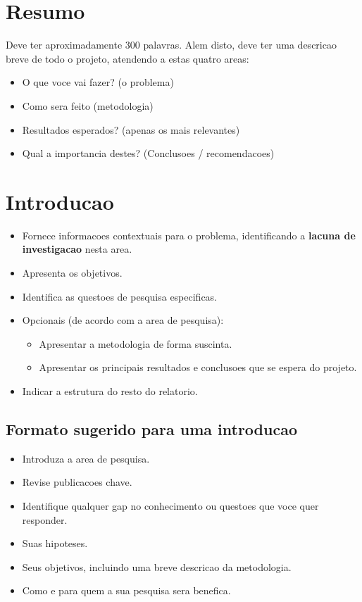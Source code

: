 \documentclass[a4paper,11pt]{article}
\begin{document}
\section{Resumo}
Deve ter aproximadamente 300 palavras. Alem disto, deve ter uma descricao breve de todo o projeto, atendendo a estas quatro areas:

\begin{itemize}
\item{O que voce vai fazer? (o problema)}
\item{Como sera feito (metodologia)}
\item{Resultados esperados? (apenas os mais relevantes)}
\item{Qual a importancia destes? (Conclusoes / recomendacoes)}
\end{itemize}

\section{Introducao}
\begin{itemize}
\item{Fornece informacoes contextuais para o problema, identificando a \textbf{lacuna de investigacao} nesta area.}
\item{Apresenta os objetivos.}
\item{Identifica as questoes de pesquisa especificas.}
\item{Opcionais (de acordo  com a area de pesquisa):}
\begin{itemize}
\item{Apresentar a metodologia de forma suscinta.}
\item{Apresentar os principais resultados e conclusoes que se espera do projeto.}
\end{itemize}
\item{Indicar a estrutura do resto do relatorio.}
\end{itemize}

\subsection{Formato sugerido para uma introducao}
\begin{itemize}
\item{Introduza a area de pesquisa.}
\item{Revise publicacoes chave.}
\item{Identifique qualquer gap no conhecimento ou questoes que voce quer responder.}
\item{Suas hipoteses.}
\item{Seus objetivos, incluindo uma breve descricao da metodologia.}
\item{Como e para quem a sua pesquisa sera benefica.}
\end{itemize}
\end{document}
